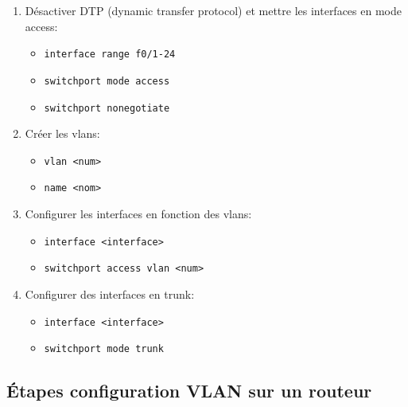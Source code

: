 \documentclass[a4paper]{article}
\begin{document}
\begin{enumerate}
    \item Désactiver DTP (dynamic transfer protocol) et mettre les interfaces en mode access:
    \begin{itemize}[label=\textbf{–}]
        \item \texttt{interface range f0/1-24}
        \item \texttt{switchport mode access}
        \item \texttt{switchport nonegotiate}
    \end{itemize}
    \item Créer les vlans:
    \begin{itemize}[label=\textbf{–}]
        \item \texttt{vlan <num>}
        \item \texttt{name <nom>}
    \end{itemize}
    \item Configurer les interfaces en fonction des vlans:
    \begin{itemize}[label=\textbf{–}]
        \item \texttt{interface <interface>}
        \item \texttt{switchport access vlan <num>}
    \end{itemize}
    \item Configurer des interfaces en trunk:
    \begin{itemize}[label=\textbf{–}]
        \item \texttt{interface <interface>}
        \item \texttt{switchport mode trunk}
    \end{itemize}
\end{enumerate}





\subsection{Étapes configuration VLAN sur un routeur}
\end{document}
